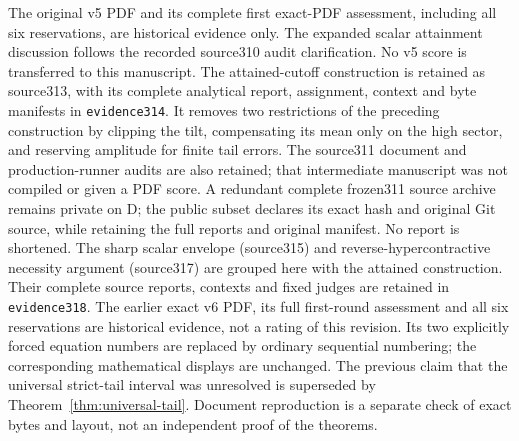 \documentclass[11pt]{article}
\begin{document}
The original v5 PDF and its complete first exact-PDF assessment, including
all six reservations, are historical evidence only. The expanded scalar
attainment discussion follows the recorded source310 audit clarification.
No v5 score is transferred to this manuscript.
The attained-cutoff construction is retained as source313, with its
complete analytical report, assignment, context and byte manifests in
\texttt{evidence314}. It removes two restrictions of the preceding
construction by clipping the tilt, compensating its mean only on the
high sector, and reserving amplitude for finite tail errors.
The source311 document and production-runner audits are also retained;
that intermediate manuscript was not compiled or given a PDF score.
A redundant complete frozen311 source archive remains private on D;
the public subset declares its exact hash and original Git source, while
retaining the full reports and original manifest. No report is shortened.
The sharp scalar envelope (source315) and reverse-hypercontractive necessity
argument (source317) are grouped here with the attained construction.
Their complete source reports, contexts and fixed judges are retained in
\texttt{evidence318}. The earlier exact v6 PDF, its full first-round
assessment and all six reservations are historical evidence, not a rating
of this revision. Its two explicitly forced equation numbers are replaced
by ordinary sequential numbering; the corresponding mathematical displays
are unchanged. The previous claim that the universal strict-tail interval
was unresolved is superseded by Theorem~\ref{thm:universal-tail}.
Document reproduction is a separate check of exact bytes
and layout, not an independent proof of the theorems.
\end{document}
